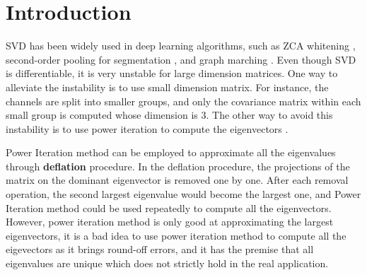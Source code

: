 
\section{Introduction}
SVD has been widely used in deep learning algorithms, such as ZCA whitening \cite{huang2018decorrelated}, second-order pooling for segmentation \cite{ionescu2015matrix}, and graph marching \cite{Zanfir_2018_CVPR}. Even though SVD is differentiable, it is very unstable for large dimension matrices. One way to alleviate the instability is to use small dimension matrix. For instance, the channels are split into smaller groups, and only the covariance matrix within each small group is computed whose dimension is 3. The other way to avoid this instability is to use power iteration to compute the eigenvectors \cite{Zanfir_2018_CVPR}. 

Power Iteration method can be employed to approximate all the eigenvalues through \textbf{deflation} procedure. In the deflation procedure, the projections of the matrix on the dominant eigenvector is removed one by one. After each removal operation, the second largest eigenvalue would become the largest one, and Power Iteration method could be used repeatedly to compute all the eigenvectors. However, power iteration method is only good at approximating the largest eigenvectors, it is a bad idea to use power iteration method to compute all the eigevectors as it brings round-off errors, and it has the premise that all eigenvalues are unique which does not strictly hold in the real application.

